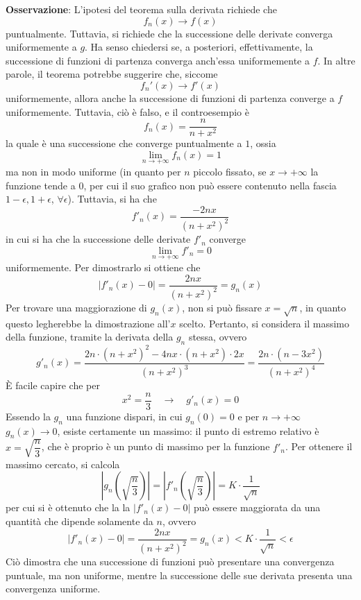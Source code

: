 \documentclass[a4paper]{extarticle}
\begin{document}
\vspace{2em}
\noindent
\textbf{Osservazione}: L'ipotesi del teorema sulla derivata richiede che
\[f_n(x) \to f(x)\]
puntualmente. Tuttavia, si richiede che la successione delle derivate converga uniformemente a $g$. Ha senso chiedersi se, a posteriori, effettivamente, la successione di funzioni di partenza converga anch'essa uniformemente a $f$. In altre parole, il teorema potrebbe suggerire che, siccome
\[f_n'(x) \to f'(x)\]
uniformemente, allora anche la successione di funzioni di partenza converge a $f$ uniformemente. Tuttavia, ciò è falso, e il controesempio è
\[f_n(x) = \frac{n}{n+x^2}\]
la quale è una successione che converge puntualmente a $1$, ossia
\[\lim_{n \to +\infty} f_n(x) = 1\]
ma non in modo uniforme (in quanto per $n$ piccolo fissato, se $x \to +\infty$ la funzione tende a $0$, per cui il suo grafico non può essere contenuto nella fascia $1-\epsilon,1+\epsilon$, $\forall \epsilon$). Tuttavia, si ha che
\[f'_n(x) = \frac{-2nx}{(n+x^2)^2}\]
in cui si ha che la successione delle derivate $f'_n$ converge
\[\lim_{n \to +\infty} f'_n = 0\]
uniformemente. Per dimostrarlo si ottiene che
\[\left \vert f'_n(x) - 0 \right \vert = \frac{2nx}{(n+x^2)^2} = g_n(x)\]
Per trovare una maggiorazione di $g_n(x)$, non si può fissare $x=\sqrt{n}$, in quanto questo legherebbe la dimostrazione all'$x$ scelto. Pertanto, si considera il massimo della funzione, tramite la derivata della $g_n$ stessa, ovvero
\[g'_n(x) = \frac{2n \cdot (n+x^2)^2 - 4n x \cdot (n+x^2) \cdot 2x}{(n+x^2)^3} = \frac{2n \cdot (n-3x^2)}{(n+x^2)^4}\]
È facile capire che per
\[x^2=\frac{n}{3} \hspace{1em} \rightarrow \hspace{1em} g'_n(x) = 0\]
Essendo la $g_n$ una funzione dispari, in cui $g_n(0)=0$ e per $n \to +\infty$ $g_n(x) \to 0$, esiste certamente un massimo: il punto di estremo relativo è $x=\sqrt{\dfrac{n}{3}}$, che è proprio è un punto di massimo per la funzione $f'_n$. Per ottenere il massimo cercato, si calcola
\[\left \vert g_n \left(\sqrt{\dfrac{n}{3}}\right) \right \vert = \left \vert f'_n \left(\sqrt{\dfrac{n}{3}}\right) \right \vert = K \cdot \dfrac{1}{\sqrt{n}}\]
per cui si è ottenuto che la la $\vert f'_n(x) - 0 \vert$ può essere maggiorata da una quantità che dipende solamente da $n$, ovvero
\[\left \vert f'_n(x) - 0 \right \vert = \frac{2nx}{(n+x^2)^2} = g_n(x) < K \cdot \dfrac{1}{\sqrt{n}} < \epsilon\]
Ciò dimostra che una successione di funzioni può presentare una convergenza puntuale, ma non uniforme, mentre la successione delle sue derivata presenta una convergenza uniforme.
\end{document}
